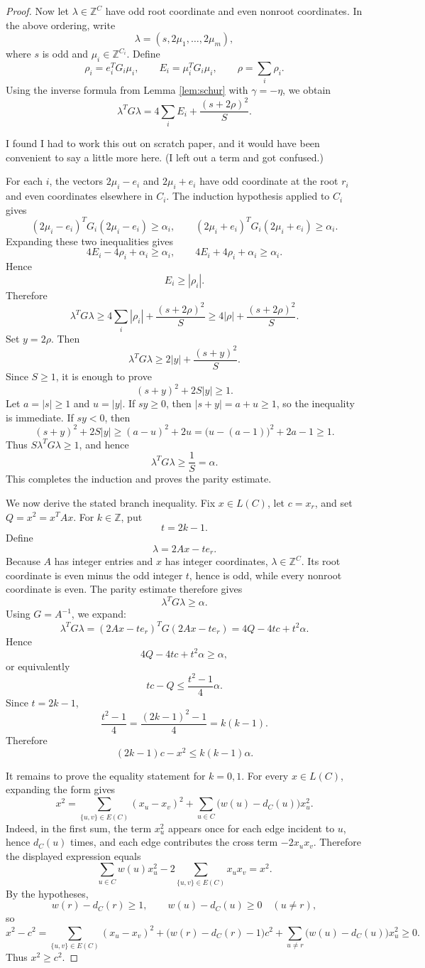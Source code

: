 \documentclass[12pt]{article}
\newcommand{\Z}{\mathbb{Z}}
\newcommand{\review}[1]{\begin{reviewbox}#1\end{reviewbox}}
\begin{document}
\begin{proof}
Now let \(\lambda\in\Z^C\) have odd root coordinate and even nonroot coordinates. In the above ordering, write
\[
\lambda=(s,2\mu_1,\dots,2\mu_m),
\]
where \(s\) is odd and \(\mu_i\in\Z^{C_i}\). Define
\[
\rho_i=e_i^TG_i\mu_i,
\qquad
E_i=\mu_i^TG_i\mu_i,
\qquad
\rho=\sum_i\rho_i.
\]
Using the inverse formula from Lemma \ref{lem:schur} with \(\gamma=-\eta\), we obtain
\[
\lambda^TG\lambda
=
4\sum_i E_i+\frac{(s+2\rho)^2}{S}.
\]
\review{I found I had to work this out on scratch paper, and it would have been convenient to say a little more here. (I left out a term and got confused.)}
For each \(i\), the vectors \(2\mu_i-e_i\) and \(2\mu_i+e_i\) have odd coordinate at the root \(r_i\) and even coordinates elsewhere in \(C_i\). The induction hypothesis applied to \(C_i\) gives
\[
(2\mu_i-e_i)^TG_i(2\mu_i-e_i)\ge \alpha_i,
\qquad
(2\mu_i+e_i)^TG_i(2\mu_i+e_i)\ge \alpha_i.
\]
Expanding these two inequalities gives
\[
4E_i-4\rho_i+\alpha_i\ge \alpha_i,
\qquad
4E_i+4\rho_i+\alpha_i\ge \alpha_i.
\]
Hence
\[
E_i\ge |\rho_i|.
\]
Therefore
\[
\lambda^TG\lambda
\ge
4\sum_i|\rho_i|+\frac{(s+2\rho)^2}{S}
\ge
4|\rho|+\frac{(s+2\rho)^2}{S}.
\]
Set \(y=2\rho\). Then
\[
\lambda^TG\lambda
\ge
2|y|+\frac{(s+y)^2}{S}.
\]
Since \(S\ge 1\), it is enough to prove
\[
(s+y)^2+2S|y|\ge 1.
\]
Let \(a=|s|\ge 1\) and \(u=|y|\). If \(sy\ge 0\), then \(|s+y|=a+u\ge 1\), so the inequality is immediate. If \(sy<0\), then
\[
(s+y)^2+2S|y|
\ge
(a-u)^2+2u
=
\bigl(u-(a-1)\bigr)^2+2a-1
\ge 1.
\]
Thus \(S\lambda^TG\lambda\ge 1\), and hence
\[
\lambda^TG\lambda\ge \frac{1}{S}=\alpha.
\]
This completes the induction and proves the parity estimate.

We now derive the stated branch inequality. Fix \(x\in L(C)\), let \(c=x_r\), and set \(Q=x^2=x^TAx\). For \(k\in\Z\), put
\[
t=2k-1.
\]
Define
\[
\lambda=2Ax-te_r.
\]
Because \(A\) has integer entries and \(x\) has integer coordinates, \(\lambda\in\Z^C\). Its root coordinate is even minus the odd integer \(t\), hence is odd, while every nonroot coordinate is even. The parity estimate therefore gives
\[
\lambda^TG\lambda\ge \alpha.
\]
Using \(G=A^{-1}\), we expand:
\[
\lambda^TG\lambda
=
(2Ax-te_r)^TG(2Ax-te_r)
=
4Q-4tc+t^2\alpha.
\]
Hence
\[
4Q-4tc+t^2\alpha\ge \alpha,
\]
or equivalently
\[
tc-Q\le \frac{t^2-1}{4}\alpha.
\]
Since \(t=2k-1\),
\[
\frac{t^2-1}{4}
=
\frac{(2k-1)^2-1}{4}
=
k(k-1).
\]
Therefore
\[
(2k-1)c-x^2\le k(k-1)\alpha.
\]

It remains to prove the equality statement for \(k=0,1\). For every \(x\in L(C)\), expanding the form gives
\[
x^2
=
\sum_{\{u,v\}\in E(C)}(x_u-x_v)^2
+
\sum_{u\in C}\bigl(w(u)-d_C(u)\bigr)x_u^2.
\]
Indeed, in the first sum, the term \(x_u^2\) appears once for each edge incident to \(u\), hence \(d_C(u)\) times, and each edge contributes the cross term \(-2x_ux_v\). Therefore the displayed expression equals
\[
\sum_{u\in C}w(u)x_u^2-2\sum_{\{u,v\}\in E(C)}x_ux_v=x^2.
\]
By the hypotheses,
\[
w(r)-d_C(r)\ge 1,
\qquad
w(u)-d_C(u)\ge 0\quad(u\ne r),
\]
so
\[
x^2-c^2
=
\sum_{\{u,v\}\in E(C)}(x_u-x_v)^2
+
\bigl(w(r)-d_C(r)-1\bigr)c^2
+
\sum_{u\ne r}\bigl(w(u)-d_C(u)\bigr)x_u^2
\ge 0.
\]
Thus \(x^2\ge c^2\).


\end{proof}
\end{document}
